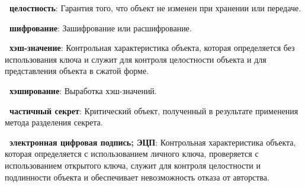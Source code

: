 {\bf \thedefctr~целостность}:
Гарантия того, что объект не изменен при хранении или передаче.

{\bf \thedefctr~шифрование}:
Зашифрование или расшифрование.

{\bf \thedefctr~хэш-значение}:
Контрольная характеристика объекта, 
которая определяется без использования ключа и 
служит для контроля целостности объекта и для представления 
объекта в сжатой форме.


{\bf \thedefctr~хэширование}:
Выработка хэш-значений.


{\bf \thedefctr~частичный секрет}:
Критический объект, 
полученный в результате применения метода разделения секрета.


{\bf \thedefctr~электронная цифровая подпись; ЭЦП}:
Контрольная характеристика объекта, 
которая определяется с использованием личного ключа, 
проверяется с использованием открытого ключа,
служит для контроля целостности и подлинности объекта 
и обеспечивает невозможность отказа от авторства.





